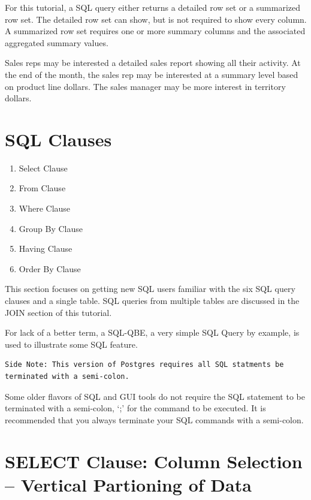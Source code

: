 \documentclass[]{book}
\providecommand{\tightlist}{%
  \setlength{\itemsep}{0pt}\setlength{\parskip}{0pt}}
\theoremstyle{definition}
\theoremstyle{definition}
\theoremstyle{definition}
\theoremstyle{remark}
\begin{document}
For this tutorial, a SQL query either returns a detailed row set or a
summarized row set. The detailed row set can show, but is not required
to show every column. A summarized row set requires one or more summary
columns and the associated aggregated summary values.

Sales reps may be interested a detailed sales report showing all their
activity. At the end of the month, the sales rep may be interested at a
summary level based on product line dollars. The sales manager may be
more interest in territory dollars.

\hypertarget{sql-clauses}{%
\section{SQL Clauses}\label{sql-clauses}}

\begin{enumerate}
\def\labelenumi{\arabic{enumi}.}
\tightlist
\item
  Select Clause
\item
  From Clause
\item
  Where Clause
\item
  Group By Clause
\item
  Having Clause
\item
  Order By Clause
\end{enumerate}

This section focuses on getting new SQL users familiar with the six SQL
query clauses and a single table. SQL queries from multiple tables are
discussed in the JOIN section of this tutorial.

For lack of a better term, a SQL-QBE, a very simple SQL Query by
example, is used to illustrate some SQL feature.

\begin{verbatim}
Side Note: This version of Postgres requires all SQL statments be terminated with a semi-colon.  
\end{verbatim}

Some older flavors of SQL and GUI tools do not require the SQL statement
to be terminated with a semi-colon, `;' for the command to be executed.
It is recommended that you always terminate your SQL commands with a
semi-colon.

\hypertarget{select-clause-column-selection-vertical-partioning-of-data}{%
\section{SELECT Clause: Column Selection -- Vertical Partioning of
Data}\label{select-clause-column-selection-vertical-partioning-of-data}}
\end{document}
